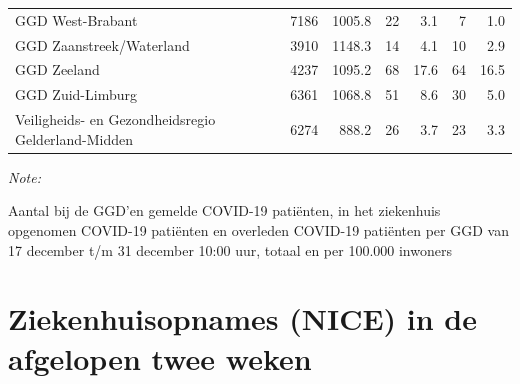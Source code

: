 \documentclass[
  english,
  man,floatsintext]{apa6}
\begin{document}
\begin{table}
\begin{threeparttable}
\begin{tabular}{lrrrrrr}
GGD West-Brabant & 7186 & 1005.8 & 22 & 3.1 & 7 & 1.0\\
GGD Zaanstreek/Waterland & 3910 & 1148.3 & 14 & 4.1 & 10 & 2.9\\
GGD Zeeland & 4237 & 1095.2 & 68 & 17.6 & 64 & 16.5\\
GGD Zuid-Limburg & 6361 & 1068.8 & 51 & 8.6 & 30 & 5.0\\
Veiligheids- en Gezondheidsregio Gelderland-Midden & 6274 & 888.2 & 26 & 3.7 & 23 & 3.3\\
\bottomrule
\end{tabular}
\begin{tablenotes}
\item \textit{Note: } 
\item Aantal bij de GGD’en gemelde COVID-19 patiënten, in het ziekenhuis opgenomen COVID-19 patiënten en overleden COVID-19 patiënten per GGD van 17 december t/m 31 december 10:00 uur, totaal en per 100.000 inwoners
\end{tablenotes}
\end{threeparttable}
\endgroup{}
\end{table}

\newpage

\hypertarget{ziekenhuisopnames-nice-in-de-afgelopen-twee-weken}{%
\section{Ziekenhuisopnames (NICE) in de afgelopen twee weken}\label{ziekenhuisopnames-nice-in-de-afgelopen-twee-weken}}
\end{document}
